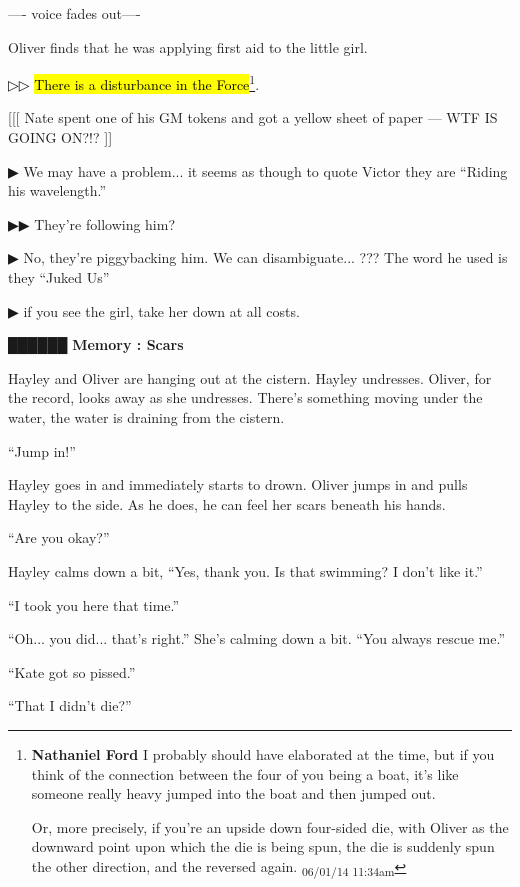 ---- voice fades out----

Oliver finds that he was applying first aid to the little girl.

▷▷ \hl{There is a disturbance in the Force}\footnote{\textbf{Nathaniel Ford }I probably should have elaborated at the time, but if you think of the connection between the four of you being a boat, it's like someone really heavy jumped into the boat and then jumped out.

Or, more precisely, if you're an upside down four-sided die, with Oliver as the downward point upon which the die is being spun, the die is suddenly spun the other direction, and the reversed again. \textsubscript{06/01/14 11:34am}}.

{[}{[}{[} Nate spent one of his GM tokens and got a yellow sheet of paper --- WTF IS GOING ON?!? {]}{]}



 {\color[RGB]{68,68,68}▶}  We may have a problem... it seems as though to quote Victor they are ``Riding his wavelength.''

 {\color[RGB]{68,68,68}▶▶} They're following him?

 {\color[RGB]{68,68,68}▶} No, they're piggybacking him.  We can disambiguate... ??? The word he used is they ``Juked Us''

 {\color[RGB]{68,68,68}▶}  if you see the girl, take her down at all costs. 



 {\LARGE \textbf{ {\color[RGB]{51,51,51}██████} } }  {\LARGE \textbf{ Memory : Scars} } 

Hayley and Oliver are hanging out at the cistern.  Hayley undresses.  Oliver, for the record, looks away as she undresses.  There's something moving under the water, the water is draining from the cistern.

``Jump in!''

Hayley goes in and immediately starts to drown.  Oliver jumps in and pulls Hayley to the side. As he does, he can feel her scars beneath his hands.

``Are you okay?''

Hayley calms down a bit, ``Yes, thank you.  Is that swimming?  I don't like it.''

``I took you here that time.''

``Oh... you did... that's right.''  She's calming down a bit.  ``You always rescue me.''

``Kate got so pissed.''

``That I didn't die?''

